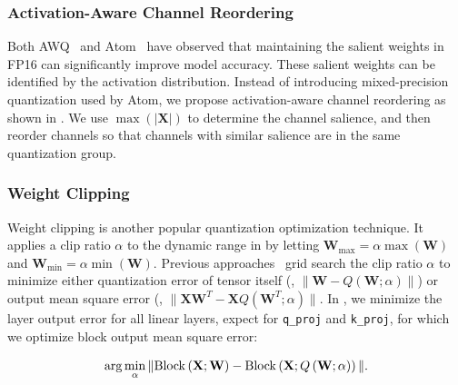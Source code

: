 \subsubsection{Activation-Aware Channel Reordering}
\label{sect:alg:other:reorder}

Both AWQ~\cite{lin2023awq} and Atom~\cite{zhao2023atom} have observed that maintaining the salient weights in FP16 can significantly improve model accuracy. These salient weights can be identified by the activation distribution. Instead of introducing mixed-precision quantization used by Atom, we propose activation-aware channel reordering as shown in . We use $\max\left(|\mathbf{X}|\right)$ to determine the channel salience, and then reorder channels so that channels with similar salience are in the same quantization group.

\subsubsection{Weight Clipping}
\label{sect:alg:other:clipping}
Weight clipping is another popular quantization optimization technique. It applies a clip ratio $\alpha$ to the dynamic range in  by letting $\mathbf{W}_{\max}=\alpha \max\left(\mathbf{W}\right)$ and $\mathbf{W}_{\min}=\alpha \min\left(\mathbf{W}\right)$.
Previous approaches~\cite{gptq,zhao2023atom,ashkboos2024quarot, lin2023awq} grid search the clip ratio $\alpha$ to minimize either quantization error of tensor itself (\ie, $\|\mathbf{W} - Q\left(\mathbf{W};\alpha\right)\|$) or output mean square error (\ie, $\|\mathbf{X}\mathbf{W}^T - \mathbf{X}Q\left(\mathbf{W}^T;\alpha\right)\|$. In \algo, we minimize the layer output error for all linear layers, expect for \texttt{q\_proj} and \texttt{k\_proj}, for which we optimize block output mean square error:

\vspace{-15pt}
\begin{equation}
    \small \arg\min_{\alpha} \|\mathrm{Block}\left(\mathbf{X}; \mathbf{W}\right) - \mathrm{Block}\left(\mathbf{X}; Q\left(\mathbf{W}; \alpha\right)\right)\|.
\end{equation}




